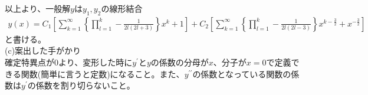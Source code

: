 \documentclass[pdflatex,ja=standard,fleqn]{bxjsarticle}
\begin{document}
以上より、一般解$y$は$y_{1},y_{2}$の線形結合
\begin{eqnarray*}
    y(x)=C_{1}\left[\sum_{k=1}^{\infty}\left\{\prod_{l=1}^{k}-\frac{1}{2l(2l+3)}\right\}x^{k}+1\right]+C_{2}\left[\sum_{k=1}^{\infty}\left\{\prod_{l=1}^{k}-\frac{1}{2l(2l-3)}\right\}x^{k-\frac{3}{2}}+x^{-\frac{3}{2}}\right]
\end{eqnarray*}
と書ける。\\
(c)案出した手がかり\\
確定特異点が0より、変形した時に$y^{\prime}$と$y$の係数の分母が$x$、分子が$x=0$で定義できる関数(簡単に言うと定数)になること。また、$y^{\prime\prime}$の係数となっている関数の係数は$y^{\prime}$の係数を割り切らないこと。
\end{document}

